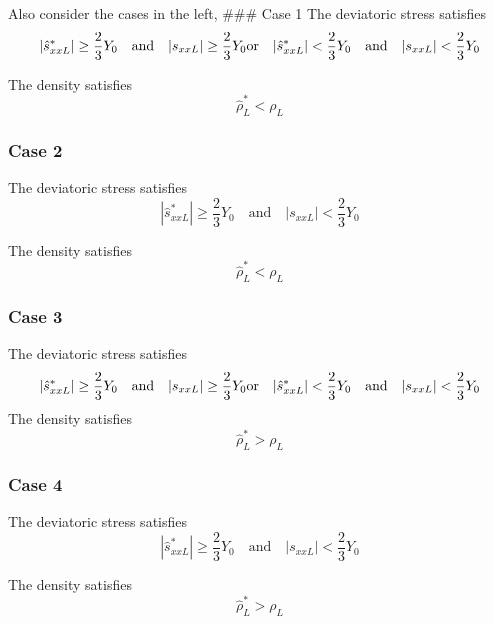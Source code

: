 \documentclass[11pt]{article}
\def\lt{<}
\begin{document}
Also consider the cases in the left, \#\#\# Case 1 The deviatoric stress
satisfies
\[| \hat{s}_{xxL}^* | \ge  \frac{2}{3}Y_0   \quad \text{and} \quad | s_{xxL} | \ge  \frac{2}{3}Y_0 \quad  \\\text{or} \quad | \hat{s}_{xxL}^* | \lt  \frac{2}{3}Y_0   \quad \text{and} \quad | s_{xxL} | \lt  \frac{2}{3}Y_0 \]

The density satisfies \[ \hat{\rho}_L^* < \rho_L\]

    \subsubsection{Case 2}\label{case-2}

The deviatoric stress satisfies
\[| \hat{s}_{xxL}^* | \ge  \frac{2}{3}Y_0   \quad \text{and} \quad | s_{xxL} | \lt  \frac{2}{3}Y_0  \]

The density satisfies \[ \hat{\rho}_L^* < \rho_L\]

    \subsubsection{Case 3}\label{case-3}

The deviatoric stress satisfies
\[| \hat{s}_{xxL}^* | \ge  \frac{2}{3}Y_0   \quad \text{and} \quad | s_{xxL} | \ge  \frac{2}{3}Y_0 \quad  \\\text{or} \quad | \hat{s}_{xxL}^* | \lt  \frac{2}{3}Y_0   \quad \text{and} \quad | s_{xxL} | \lt  \frac{2}{3}Y_0 \]
The density satisfies \[ \hat{\rho}_L^* > \rho_L\]

    \subsubsection{Case 4}\label{case-4}

The deviatoric stress satisfies
\[| \hat{s}_{xxL}^* | \ge  \frac{2}{3}Y_0   \quad \text{and} \quad | s_{xxL} | \lt  \frac{2}{3}Y_0  \]

The density satisfies \[ \hat{\rho}_L^* > \rho_L\]
\end{document}
